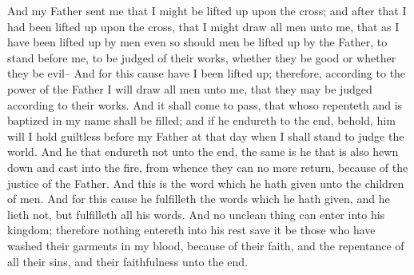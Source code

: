 And my Father sent me that I might be lifted up upon the cross; and after that I had been lifted up upon the cross, that I might draw all men unto me, that as I have been lifted up by men even so should men be lifted up by the Father, to stand before me, to be judged of their works, whether they be good or whether they be evil--
\bverse \iffalse And for this cause have I been lifted up; therefore, according to the power of the Father I will draw all men unto me, that they may be judged according to their works. \fi
And for this cause have I been lifted up; therefore, according to the power of the Father I will draw all men unto me, that they may be judged according to their works.
\bverse \iffalse And it shall come to pass, that whoso repenteth and is baptized in my name shall be filled; and if he endureth to the end, behold, him will I hold guiltless before my Father at that day when I shall stand to judge the world. \fi
And it shall come to pass, that whoso repenteth and is baptized in my name shall be filled; and if he endureth to the end, behold, him will I hold guiltless before my Father at that day when I shall stand to judge the world.
\bverse \iffalse And he that endureth not unto the end, the same is he that is also hewn down and cast into the fire, from whence they can no more return, because of the justice of the Father. \fi
And he that endureth not unto the end, the same is he that is also hewn down and cast into the fire, from whence they can no more return, because of the justice of the Father.
\bverse \iffalse And this is the word which he hath given unto the children of men. And for this cause he fulfilleth the words which he hath given, and he lieth not, but fulfilleth all his words. \fi
And this is the word which he hath given unto the children of men. And for this cause he fulfilleth the words which he hath given, and he lieth not, but fulfilleth all his words.
\bverse \iffalse And no unclean thing can enter into his kingdom; therefore nothing entereth into his rest save it be those who have washed their garments in my blood, because of their faith, and the repentance of all their sins, and their faithfulness unto the end. \fi
And no unclean thing can enter into his kingdom; therefore nothing entereth into his rest save it be those who have washed their garments in my blood, because of their faith, and the repentance of all their sins, and their faithfulness unto the end.
\bverse \iffalse Now this is the commandment: Repent, all ye ends of the earth, and come unto me and be baptized in my name, that ye may be sanctified by the reception of the Holy Ghost, that ye may stand spotless before me at the last day. \fi
